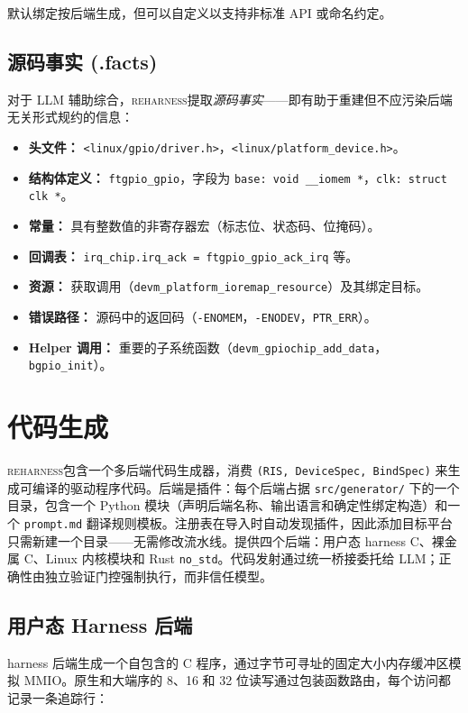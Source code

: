 \documentclass[sigplan, screen, review, anonymous]{acmart}
\newcommand{\reharness}{\textsc{reharness}}
\begin{document}
默认绑定按后端生成，但可以自定义以支持非标准 API 或命名约定。

\subsection{源码事实 (.facts)}

对于 LLM 辅助综合，\reharness 提取\emph{源码事实}——即有助于重建但不应污染后端无关形式规约的信息：

\begin{itemize}
\item \textbf{头文件：} \texttt{<linux/gpio/driver.h>}，\texttt{<linux/platform\_device.h>}。
\item \textbf{结构体定义：} \texttt{ftgpio\_gpio}，字段为 \texttt{base: void \_\_iomem *}，\texttt{clk: struct clk *}。
\item \textbf{常量：} 具有整数值的非寄存器宏（标志位、状态码、位掩码）。
\item \textbf{回调表：} \texttt{irq\_chip.irq\_ack = ftgpio\_gpio\_ack\_irq} 等。
\item \textbf{资源：} 获取调用（\texttt{devm\_platform\_ioremap\_resource}）及其绑定目标。
\item \textbf{错误路径：} 源码中的返回码（\texttt{-ENOMEM}，\texttt{-ENODEV}，\texttt{PTR\_ERR}）。
\item \textbf{Helper 调用：} 重要的子系统函数（\texttt{devm\_gpiochip\_add\_data}，\texttt{bgpio\_init}）。
\end{itemize}

\section{代码生成}

\reharness 包含一个多后端代码生成器，消费 \texttt{(RIS, DeviceSpec, BindSpec)} 来生成可编译的驱动程序代码。后端是插件：每个后端占据 \texttt{src/generator/} 下的一个目录，包含一个 Python 模块（声明后端名称、输出语言和确定性绑定构造）和一个 \texttt{prompt.md} 翻译规则模板。注册表在导入时自动发现插件，因此添加目标平台只需新建一个目录——无需修改流水线。提供四个后端：用户态 harness C、裸金属 C、Linux 内核模块和 Rust \texttt{no\_std}。代码发射通过统一桥接委托给 LLM；正确性由独立验证门控强制执行，而非信任模型。

\subsection{用户态 Harness 后端}

harness 后端生成一个自包含的 C 程序，通过字节可寻址的固定大小内存缓冲区模拟 MMIO。原生和大端序的 8、16 和 32 位读写通过包装函数路由，每个访问都记录一条追踪行：
\end{document}
